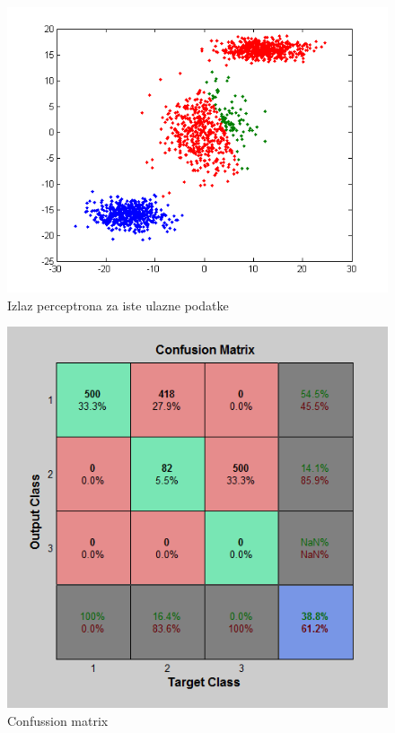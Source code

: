 \documentclass{report}
\begin{document}
\begin{enumerate}
\begin{enumerate}
\begin{figure}[!h]
\begin{center}
\includegraphics[scale=0.8]{A1outputPerceptronSame.png}
\caption{Izlaz perceptrona za iste ulazne podatke}
\end{center}
\end{figure}

\begin{figure}[!h]
\begin{center}
\includegraphics[scale=0.7]{A1confussionPerceptron.png}
\end{center}
\caption{Confussion matrix}
\end{figure}


\end{enumerate}
\end{enumerate}
\end{document}
